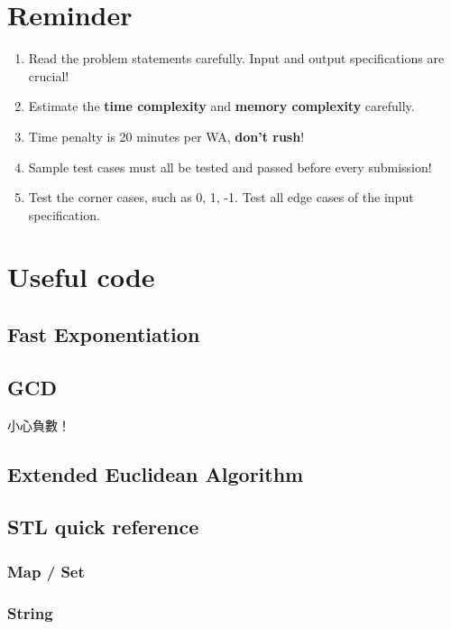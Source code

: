 \documentclass[10pt,twocolumn,oneside]{article} %
\begin{document}

\section{Reminder}

\begin{enumerate}
	\item Read the problem statements carefully. Input and output specifications are crucial!
	\item Estimate the \textbf{time complexity} and \textbf{memory complexity} carefully.
	\item Time penalty is 20 minutes per WA, \textbf{don't rush}!
	\item Sample test cases must all be tested and passed before every submission!
	\item Test the corner cases, such as 0, 1, -1. Test all edge cases of the input specification.
\end{enumerate}


\section{Useful code}

\subsection{Fast Exponentiation}

\subsection{GCD}

小心負數！

\subsection{Extended Euclidean Algorithm}

\subsection{STL quick reference}

\subsubsection{Map / Set}

\subsubsection{String}
\end{document}
